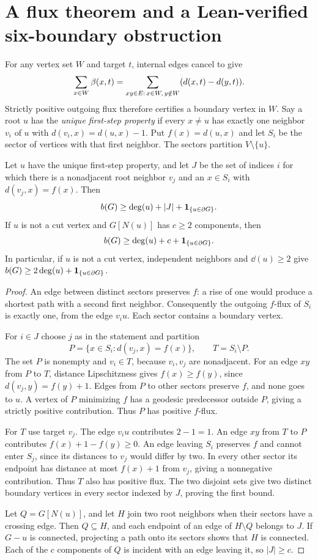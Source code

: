 \section{A flux theorem and a Lean-verified six-boundary obstruction}
For any vertex set $W$ and target $t$, internal edges cancel to give
\begin{equation}\label{eq:flux}
 \sum_{x\in W}\beta(x,t)=
 \sum_{xy\in E:\,x\in W,\,y\notin W}(d(x,t)-d(y,t)).
\end{equation}
Strictly positive outgoing flux therefore certifies a boundary vertex in $W$.
Say a root $u$ has the \emph{unique first-step property} if every $x\ne u$
has exactly one neighbor $v_i$ of $u$ with $d(v_i,x)=d(u,x)-1$.
Put $f(x)=d(u,x)$ and let $S_i$ be the sector of vertices with that first
neighbor. The sectors partition $V\setminus\{u\}$.

\begin{theorem}\label{thm:sectors}
Let $u$ have the unique first-step property, and let $J$ be the set of
indices $i$ for which there is a nonadjacent root neighbor $v_j$ and
an $x\in S_i$ with $d(v_j,x)=f(x)$. Then
\[
 b(G)\ge\operatorname{deg}(u)+|J|+\mathbf 1_{\{u\in\partial G\}}.
\]
If $u$ is not a cut vertex and $G[N(u)]$ has $c\ge2$ components, then
\[
 b(G)\ge\operatorname{deg}(u)+c+\mathbf 1_{\{u\in\partial G\}}.
\]
In particular, if $u$ is not a cut vertex, independent neighbors and $\dd(u)\ge2$ give
$b(G)\ge2\operatorname{deg}(u)+\mathbf 1_{\{u\in\partial G\}}$.
\end{theorem}
\begin{proof}
An edge between distinct sectors preserves $f$: a rise of one would
produce a shortest path with a second first neighbor. Consequently the
outgoing $f$-flux of $S_i$ is exactly one, from the edge $v_i u$.
Each sector contains a boundary vertex.

For $i\in J$ choose $j$ as in the statement and partition
\[
 P=\{x\in S_i:d(v_j,x)=f(x)\},\qquad T=S_i\setminus P.
\]
The set $P$ is nonempty and $v_i\in T$, because $v_i,v_j$ are nonadjacent.
For an edge $xy$ from $P$ to $T$, distance Lipschitzness gives
$f(x)\ge f(y)$, since $d(v_j,y)=f(y)+1$.
Edges from $P$ to other sectors preserve $f$, and none goes to $u$.
A vertex of $P$ minimizing $f$ has a geodesic predecessor outside $P$,
giving a strictly positive contribution. Thus $P$ has positive $f$-flux.

For $T$ use target $v_j$. The edge $v_i u$ contributes $2-1=1$.
An edge $xy$ from $T$ to $P$ contributes $f(x)+1-f(y)\ge0$.
An edge leaving $S_i$ preserves $f$ and cannot enter $S_j$, since its
distances to $v_j$ would differ by two. In every other sector its endpoint
has distance at most $f(x)+1$ from $v_j$, giving a nonnegative contribution.
Thus $T$ also has positive flux. The two disjoint sets give two distinct
boundary vertices in every sector indexed by $J$, proving the first bound.

Let $Q=G[N(u)]$, and let $H$ join two root neighbors when their sectors
have a crossing edge. Then $Q\subseteq H$, and each endpoint of an edge
of $H\setminus Q$ belongs to $J$. If $G-u$ is connected, projecting a
path onto its sectors shows that $H$ is connected. Each of the $c$
components of $Q$ is incident with an edge leaving it, so $|J|\ge c$.
\end{proof}

